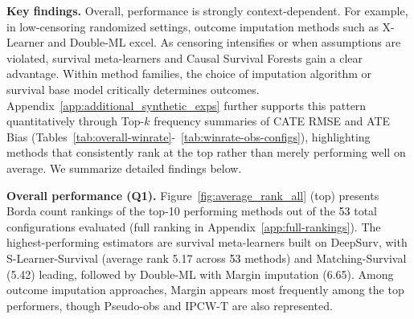\documentclass{article} %
\newcommand{\rebuttal}[1]{\textcolor{black}{#1}}
\begin{document}
\textbf{Key findings.}
Overall, performance is strongly context-dependent. For example, in low-censoring randomized settings, outcome imputation methods such as X-Learner and Double-ML excel. As censoring intensifies or when assumptions are violated, survival meta-learners and Causal Survival Forests gain a clear advantage. Within method families, the choice of imputation algorithm or survival base model critically determines outcomes. 
Appendix~\ref{app:additional_synthetic_exps} further supports this pattern quantitatively through Top-$k$ frequency summaries of CATE RMSE and ATE Bias (Tables~\ref{tab:overall-winrate}-~\ref{tab:winrate-obs-configs}), highlighting methods that consistently rank at the top rather than merely performing well on average.
We summarize detailed findings below.

\textbf{Overall performance (Q1).}  Figure~\ref{fig:average_rank_all} (top) presents Borda count rankings of the top-10 performing methods out of the \rebuttal{53} total configurations evaluated (full ranking in Appendix~\ref{app:full-rankings}). 
The highest-performing estimators are survival meta-learners built on DeepSurv, with S-Learner-Survival (average rank 5.17 across \rebuttal{53} methods) and Matching-Survival (5.42) leading, followed by Double-ML with Margin imputation (6.65). 
Among outcome imputation approaches, Margin appears most frequently among the top performers, though Pseudo-obs and IPCW-T are also represented. 
\end{document}
